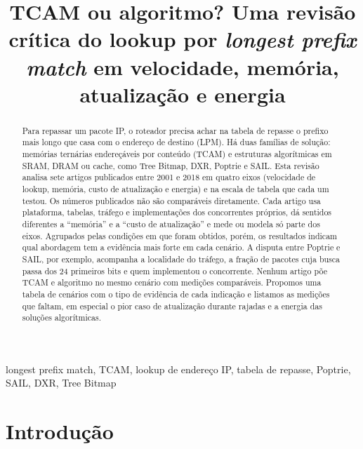 \documentclass[conference,a4paper]{IEEEtran}
\begin{document}
\title{TCAM ou algoritmo? Uma revisão crítica do lookup por \textit{longest prefix match} em velocidade, memória, atualização e energia}

\author{
}

\maketitle

\begin{abstract}
Para repassar um pacote IP, o roteador precisa achar na tabela de repasse o prefixo mais longo que casa com o
endereço de destino (LPM). Há duas famílias de solução: memórias ternárias endereçáveis por conteúdo (TCAM) e
estruturas algorítmicas em SRAM, DRAM ou cache, como Tree Bitmap, DXR, Poptrie e SAIL. Esta revisão analisa sete
artigos publicados entre 2001 e 2018 em quatro eixos (velocidade de lookup, memória, custo de atualização e energia) e
na escala de tabela que cada um testou. Os números publicados não são comparáveis diretamente. Cada artigo usa
plataforma, tabelas, tráfego e implementações dos concorrentes próprios, dá sentidos diferentes a ``memória'' e a
``custo de atualização'' e mede ou modela só parte dos eixos. Agrupados pelas condições em que foram obtidos, porém,
os resultados indicam qual abordagem tem a evidência mais forte em cada cenário. A disputa entre Poptrie e SAIL, por
exemplo, acompanha a localidade do tráfego, a fração de pacotes cuja busca passa dos 24 primeiros bits e quem
implementou o concorrente.
Nenhum artigo põe TCAM e algoritmo no mesmo cenário com medições comparáveis. Propomos uma tabela de cenários com o
tipo de evidência de cada indicação e listamos as medições que faltam, em especial o pior caso de atualização durante
rajadas e a energia das soluções algorítmicas.
\end{abstract}

\begin{IEEEkeywords}
longest prefix match, TCAM, lookup de endereço IP, tabela de repasse, Poptrie, SAIL, DXR, Tree Bitmap
\end{IEEEkeywords}

\section{Introdução}
\end{document}
